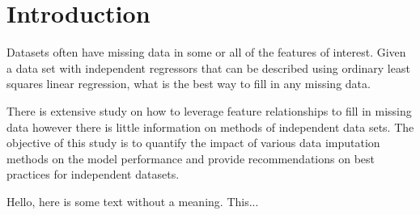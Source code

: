 \documentclass[../paper.tex]{subfiles}
\begin{document}
\section{Introduction}

Datasets often have missing data in some or all of the features of interest.
Given a data set with independent regressors that can be described using ordinary least squares linear regression, what is the best way to fill in any missing data.


There is extensive study on how to leverage feature relationships to fill in missing data however there is little information on methods of independent data sets.
The objective of this study is to quantify the impact of various data imputation methods on the model performance and provide recommendations on best practices for independent datasets.




Hello, here is some text without a meaning.  This...
\end{document}

